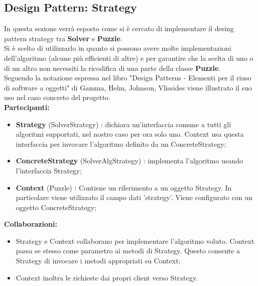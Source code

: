 	\subsection{Design Pattern: Strategy} \label{DPS}
In questa sezione verrà esposto come si è cercato di implementare il desing pattern strategy tra \textbf{Solver} e \textbf{Puzzle}. \\
Si è scelto di utilizzarlo in quanto si possono avere molte implementazioni dell'algoritmo (alcune più efficienti di altre) e per garantire che la scelta di uno o di un altro non necessiti la ricodifica di una parte della classe \textbf{Puzzle}. \\
Seguendo la notazione espressa nel libro "Design Patterns - Elementi per il riuso di software a oggetti" di Gamma, Helm, Johnson, Vlissides viene illustrato il suo uso nel caso concreto del progetto. \\
\textbf{Partecipanti:}
		\begin{itemize}
			\item \textbf{Strategy} (SolverStrategy) :  dichiara un'interfaccia comune a tutti gli algoritmi supportati, nel nostro caso per ora solo uno. Context usa questa interfaccia per invocare l'algoritmo definito da un ConcreteStrategy;
			\item \textbf{ConcreteStrategy} (SolverAlgStrategy) : implementa l'algoritmo usando l'interfaccia Strategy;
			\item \textbf{Context} (Puzzle) : Contiene un riferimento a un oggetto Strategy. In particolare viene utilizzato il campo dati 'strategy'. Viene configurato con un oggetto ConcreteStrategy; \\
		\end{itemize}
\noindent
\textbf{Collaborazioni:}
		\begin{itemize}
			\item Strategy e Context collaborano per implementare l'algoritmo voluto. Context passa se stesso come parametro ai metodi di Strategy. Questo consente a Strategy di invocare i metodi appropriati su Context;
			\item Context inoltra le richieste dai propri client verso Strategy.
		\end{itemize}



